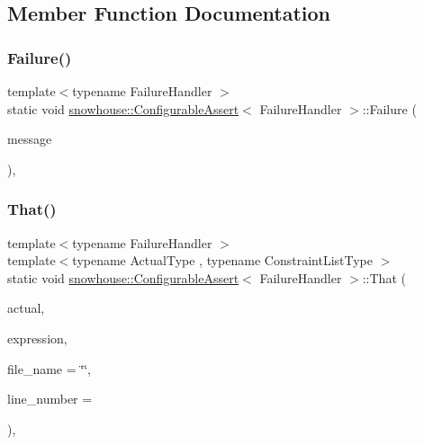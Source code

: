 \subsection{Member Function Documentation}
\mbox{\label{structsnowhouse_1_1ConfigurableAssert_a08eabf3ac0349791258e771e07618107}} 
\subsubsection{\texorpdfstring{Failure()}{Failure()}}
{\footnotesize\ttfamily template$<$typename Failure\+Handler $>$ \\
static void \mbox{\hyperlink{structsnowhouse_1_1ConfigurableAssert}{snowhouse\+::\+Configurable\+Assert}}$<$ Failure\+Handler $>$\+::Failure (\begin{DoxyParamCaption}\item[{const std\+::string \&}]{message }\end{DoxyParamCaption})\hspace{0.3cm}{\ttfamily [inline]}, {\ttfamily [static]}}

\mbox{\label{structsnowhouse_1_1ConfigurableAssert_acbd3370fc5497894fc9f9db3f533e9a3}} 
\subsubsection{\texorpdfstring{That()}{That()}\hspace{0.1cm}{\footnotesize\ttfamily [1/5]}}
{\footnotesize\ttfamily template$<$typename Failure\+Handler $>$ \\
template$<$typename Actual\+Type , typename Constraint\+List\+Type $>$ \\
static void \mbox{\hyperlink{structsnowhouse_1_1ConfigurableAssert}{snowhouse\+::\+Configurable\+Assert}}$<$ Failure\+Handler $>$\+::That (\begin{DoxyParamCaption}\item[{const Actual\+Type \&}]{actual,  }\item[{\mbox{\hyperlink{structsnowhouse_1_1ExpressionBuilder}{Expression\+Builder}}$<$ Constraint\+List\+Type $>$}]{expression,  }\item[{const char $\ast$}]{file\+\_\+name = {\ttfamily \char`\"{}\char`\"{}},  }\item[{int}]{line\+\_\+number = {} }\end{DoxyParamCaption})\hspace{0.3cm}{\ttfamily [inline]}, {\ttfamily [static]}}

